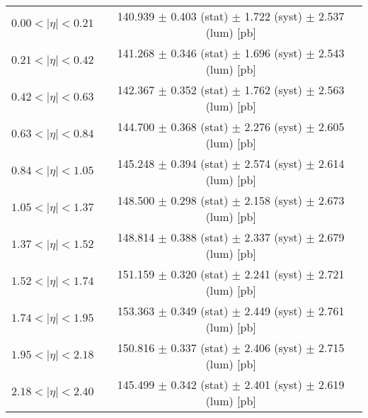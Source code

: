 \begin{tabular}{lc}
\hline
$0.00 < |\eta| <0.21$          & 140.939 $\pm$ 0.403 (stat) $\pm$ 1.722 (syst) $\pm$ 2.537 (lum) [pb]  \\
$0.21 < |\eta| <0.42$          & 141.268 $\pm$ 0.346 (stat) $\pm$ 1.696 (syst) $\pm$ 2.543 (lum) [pb]  \\
$0.42 < |\eta| <0.63$          & 142.367 $\pm$ 0.352 (stat) $\pm$ 1.762 (syst) $\pm$ 2.563 (lum) [pb]  \\
$0.63 < |\eta| <0.84$          & 144.700 $\pm$ 0.368 (stat) $\pm$ 2.276 (syst) $\pm$ 2.605 (lum) [pb]  \\
$0.84 < |\eta| <1.05$          & 145.248 $\pm$ 0.394 (stat) $\pm$ 2.574 (syst) $\pm$ 2.614 (lum) [pb]  \\
$1.05 < |\eta| <1.37$          & 148.500 $\pm$ 0.298 (stat) $\pm$ 2.158 (syst) $\pm$ 2.673 (lum) [pb]  \\
$1.37 < |\eta| <1.52$          & 148.814 $\pm$ 0.388 (stat) $\pm$ 2.337 (syst) $\pm$ 2.679 (lum) [pb]  \\
$1.52 < |\eta| <1.74$          & 151.159 $\pm$ 0.320 (stat) $\pm$ 2.241 (syst) $\pm$ 2.721 (lum) [pb]  \\
$1.74 < |\eta| <1.95$          & 153.363 $\pm$ 0.349 (stat) $\pm$ 2.449 (syst) $\pm$ 2.761 (lum) [pb]  \\
$1.95 < |\eta| <2.18$          & 150.816 $\pm$ 0.337 (stat) $\pm$ 2.406 (syst) $\pm$ 2.715 (lum) [pb]  \\
$2.18 < |\eta| <2.40$          & 145.499 $\pm$ 0.342 (stat) $\pm$ 2.401 (syst) $\pm$ 2.619 (lum) [pb]  \\
\hline
\end{tabular}
